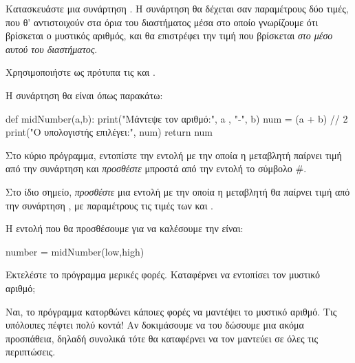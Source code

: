 \documentclass[a4paper,11pt,oneside]{book}
\begin{document}
\begin{step}
Κατασκευάστε μια συνάρτηση . Η συνάρτηση θα δέχεται σαν παραμέτρους δύο τιμές, που θ' αντιστοιχούν στα όρια του διαστήματος μέσα στο οποίο γνωρίζουμε ότι βρίσκεται ο μυστικός αριθμός, και θα επιστρέφει την τιμή που βρίσκεται%
\emph{στο μέσο αυτού του διαστήματος}.

\begin{note}
Χρησιμοποιήστε ως πρότυπα τις  και .
\end{note}

\begin{answer}
Η συνάρτηση  θα είναι όπως παρακάτω:

\begin{pynew}
def midNumber(a,b):
    print("Μάντεψε τον αριθμό:", a , "-", b)
    num = (a + b) // 2
    print("Ο υπολογιστής επιλέγει:", num)
    return num
\end{pynew}
\end{answer}

\clearpage
Στο κύριο πρόγραμμα, εντοπίστε την εντολή με την οποία η μεταβλητή  παίρνει τιμή από την συνάρτηση  και \emph{προσθέστε} μπροστά από την εντολή το σύμβολο \#.

Στο ίδιο σημείο, \emph{προσθέστε} μια εντολή με την οποία η μεταβλητή  θα παίρνει τιμή από την συνάρτηση , με παραμέτρους τις τιμές των  και .

\begin{answer}
Η εντολή που θα προσθέσουμε για να καλέσουμε την  είναι: 

\begin{pynew}
number = midNumber(low,high)
\end{pynew}
\end{answer}
\end{step}

Εκτελέστε το πρόγραμμα μερικές φορές. Καταφέρνει να εντοπίσει τον μυστικό αριθμό;

\begin{answer}
Ναι, το πρόγραμμα κατορθώνει κάποιες φορές να μαντέψει το μυστικό αριθμό. Τις υπόλοιπες πέφτει πολύ κοντά! Αν δοκιμάσουμε να του δώσουμε μια ακόμα προσπάθεια, δηλαδή  συνολικά τότε θα καταφέρνει να τον μαντεύει σε όλες τις περιπτώσεις.
\end{answer}
\end{document}
